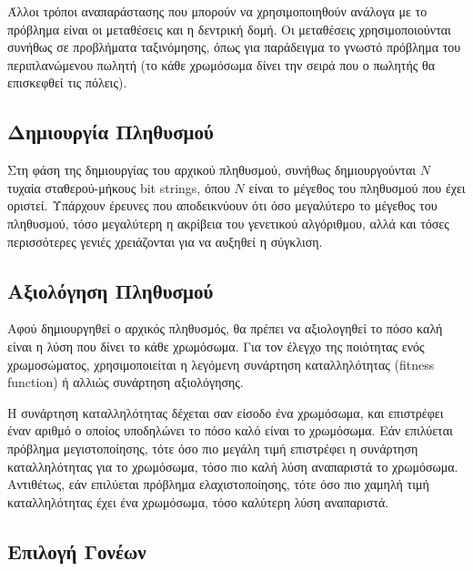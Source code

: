 Άλλοι τρόποι αναπαράστασης που μπορούν να χρησιμοποιηθούν ανάλογα με το πρόβλημα είναι οι μεταθέσεις και η δεντρική δομή. Οι μεταθέσεις χρησιμοποιούνται συνήθως σε προβλήματα ταξινόμησης, όπως για παράδειγμα το γνωστό πρόβλημα του περιπλανώμενου πωλητή (το κάθε χρωμόσωμα δίνει την σειρά που ο πωλητής θα επισκεφθεί τις πόλεις). \cite{Obitko}

\subsection{Δημιουργία Πληθυσμού}

Στη φάση της δημιουργίας του αρχικού πληθυσμού, συνήθως δημιουργούνται $Ν$ τυχαία σταθερού-μήκους bit strings, όπου $Ν$ είναι το μέγεθος του πληθυσμού που έχει οριστεί. Υπάρχουν έρευνες που αποδεικνύουν ότι όσο μεγαλύτερο το μέγεθος του πληθυσμού, τόσο μεγαλύτερη η ακρίβεια του γενετικού αλγόριθμου, αλλά και τόσες περισσότερες γενιές χρειάζονται για να αυξηθεί η σύγκλιση. \cite{Gotshall2008}

\subsection{Αξιολόγηση Πληθυσμού}


Αφού δημιουργηθεί ο αρχικός πληθυσμός, θα πρέπει να αξιολογηθεί το πόσο καλή είναι η λύση που δίνει το κάθε χρωμόσωμα. Για τον έλεγχο της ποιότητας ενός χρωμοσώματος, χρησιμοποιείται η λεγόμενη συνάρτηση καταλληλότητας (fitness function) ή αλλιώς συνάρτηση αξιολόγησης.

Η συνάρτηση καταλληλότητας δέχεται σαν είσοδο ένα χρωμόσωμα, και επιστρέφει έναν αριθμό ο οποίος υποδηλώνει το πόσο καλό είναι το χρωμόσωμα. Εάν επιλύεται πρόβλημα μεγιστοποίησης, τότε όσο πιο μεγάλη τιμή επιστρέφει η συνάρτηση καταλληλότητας για το χρωμόσωμα, τόσο πιο καλή λύση αναπαριστά το χρωμόσωμα. Αντιθέτως, εάν επιλύεται πρόβλημα ελαχιστοποίησης, τότε όσο πιο χαμηλή τιμή καταλληλότητας έχει ένα χρωμόσωμα, τόσο καλύτερη λύση αναπαριστά.

\subsection{Επιλογή Γονέων}

